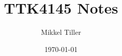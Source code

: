 \documentclass[11pt, a4paper, USenglish]{article}
\begin{document}
\title{TTK4145 Notes}
\author{Mikkel Tiller}
\date{\today}
\maketitle

\newpage

\newpage

\newpage

\newpage

\newpage

\newpage

\newpage

\end{document}
